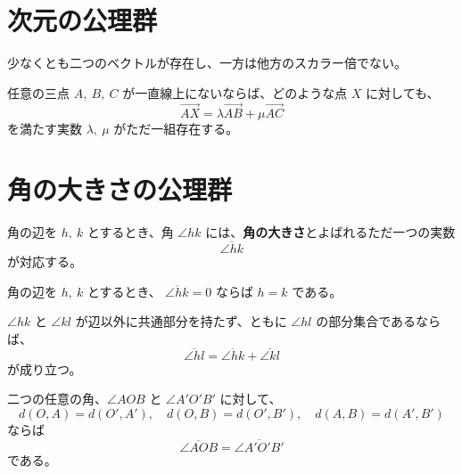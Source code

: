 \section{次元の公理群}

\begin{axm}\label{axiom:13}
  少なくとも二つのベクトルが存在し、一方は他方のスカラー倍でない。
\end{axm}

\begin{axm}\label{axiom:14}
  任意の三点 \(A,\ B,\ C\) が一直線上にないならば、どのような点 \(X\) に対しても、
  \[\overrightarrow{AX}=\lambda\overrightarrow{AB}+\mu\overrightarrow{AC}\]
  を満たす実数 \(\lambda,\ \mu\) がただ一組存在する。
\end{axm}

\section{角の大きさの公理群}

\begin{axm}\label{axiom:15}
  角の辺を \(h,\ k\) とするとき、角 \(\angle{hk}\) には、\textbf{角の大きさ}とよばれるただ一つの実数
  \[\overline{\angle{hk}}\]
  が対応する。
\end{axm}

\begin{axm}\label{axiom:16}
  角の辺を \(h,\ k\) とするとき、
  \(\overline{\angle{hk}}=0\) ならば \(h=k\) である。
\end{axm}

\begin{axm}\label{axiom:17}
  \(\angle{hk}\) と \(\angle{kl}\) が辺以外に共通部分を持たず、ともに \(\angle{hl}\) の部分集合であるならば、
  \[\overline{\angle{hl}}=\overline{\angle{hk}}+\overline{\angle{kl}}\]
  が成り立つ。
\end{axm}

\begin{axm}\label{axiom:18}
  二つの任意の角、\(\angle{AOB}\) と \(\angle{A'O'B'}\) に対して、
  \[d(O,A)=d(O',A'),\quad d(O,B)=d(O',B'),\quad d(A,B)=d(A',B')\]
  ならば
  \[\overline{\angle{AOB}}=\overline{\angle{A'O'B'}}\]
  である。
\end{axm}
